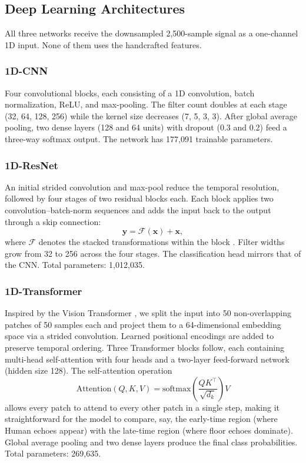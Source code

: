 \documentclass[conference,a4paper]{IEEEtran}
\begin{document}
\subsection{Deep Learning Architectures}

All three networks receive the downsampled 2{,}500-sample signal as a one-channel 1D input. None of them uses the handcrafted features.

\subsubsection{1D-CNN}
Four convolutional blocks, each consisting of a 1D convolution, batch normalization, ReLU, and max-pooling. The filter count doubles at each stage (32, 64, 128, 256) while the kernel size decreases (7, 5, 3, 3). After global average pooling, two dense layers (128 and 64 units) with dropout (0.3 and 0.2) feed a three-way softmax output. The network has 177{,}091 trainable parameters.

\subsubsection{1D-ResNet}
An initial strided convolution and max-pool reduce the temporal resolution, followed by four stages of two residual blocks each. Each block applies two convolution--batch-norm sequences and adds the input back to the output through a skip connection:
\begin{equation}
    \mathbf{y} = \mathcal{F}(\mathbf{x}) + \mathbf{x},
    \label{eq:resnet}
\end{equation}
where $\mathcal{F}$ denotes the stacked transformations within the block \cite{he2016}. Filter widths grow from 32 to 256 across the four stages. The classification head mirrors that of the CNN. Total parameters: 1{,}012{,}035.

\subsubsection{1D-Transformer}
Inspired by the Vision Transformer \cite{dosovitskiy2021}, we split the input into 50 non-overlapping patches of 50 samples each and project them to a 64-dimensional embedding space via a strided convolution. Learned positional encodings are added to preserve temporal ordering. Three Transformer blocks follow, each containing multi-head self-attention with four heads \cite{vaswani2017} and a two-layer feed-forward network (hidden size 128). The self-attention operation
\begin{equation}
    \mathrm{Attention}(Q,K,V) = \mathrm{softmax}\!\left(\frac{QK^\top}{\sqrt{d_k}}\right)V
    \label{eq:attention}
\end{equation}
allows every patch to attend to every other patch in a single step, making it straightforward for the model to compare, say, the early-time region (where Human echoes appear) with the late-time region (where floor echoes dominate). Global average pooling and two dense layers produce the final class probabilities. Total parameters: 269{,}635.
\end{document}
